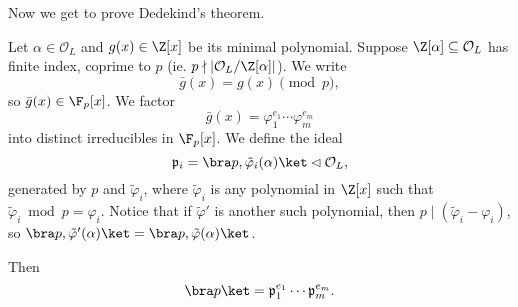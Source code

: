 \documentclass[a4paper]{article}
\begin{document}
Now we get to prove Dedekind's theorem.

\begin{thm}
  Let $\alpha \in \mathcal{O}_L$ and $g(x) \in \Z[x]$ be its minimal polynomial. Suppose $\Z[\alpha] \subseteq \mathcal{O}_L$ has finite index, coprime to $p$ (ie. $p \nmid |\mathcal{O}_L/\Z[\alpha]|$). We write
  \[
    \bar{g}(x) = g(x) \pmod p,
  \]
  so $\bar{g}(x) \in \F_p[x]$. We factor
  \[
    \bar{g}(x) = \varphi_1^{e_1} \cdots \varphi_m^{e_m}
  \]
  into distinct irreducibles in $\F_p[x]$. We define the ideal
  \[
    \mathfrak{p}_i = \bra p, \tilde{\varphi}_i(\alpha)\ket \lhd \mathcal{O}_L,
  \]
  generated by $p$ and $\tilde{\varphi}_i$, where $\tilde{\varphi}_i$ is any polynomial in $\Z[x]$ such that $\tilde{\varphi}_i \bmod p = \varphi_i$. Notice that if $\tilde{\varphi}'$ is another such polynomial, then $p \mid (\tilde{\varphi}_i - \varphi_i)$, so $\bra p, \tilde{\varphi}'(\alpha)\ket = \bra p, \tilde{\varphi}(\alpha)\ket$.

  Then
  \[
    \bra p\ket = \mathfrak{p}_1^{e_1} \cdots \mathfrak{p}_m^{e_m}.
  \]
\end{thm}
\end{document}
